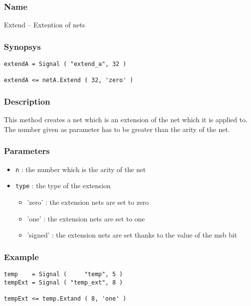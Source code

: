 \subsubsection{Name}

Extend -- Extention of nets

\subsubsection{Synopsys}

\begin{verbatim}
extendA = Signal ( "extend_a", 32 )

extendA <= netA.Extend ( 32, 'zero' ) 
\end{verbatim}

\subsubsection{Description}

This method creates a net which is an extension of the net which it is applied to. The number given as parameter has to be greater than the arity of the net.

\subsubsection{Parameters}

\begin{itemize}
    \item \verb-n- : the number which is the arity of the net
    \item \verb-type- : the type of the extension
    \begin{itemize}
        \item 'zero' : the extension nets are set to zero
        \item 'one' : the extension nets are set to one
        \item 'signed' : the extension nets are set thanks to the value of the msb bit
    \end{itemize}
\end{itemize}

\subsubsection{Example}

\begin{verbatim}
temp    = Signal (     "temp", 5 )
tempExt = Signal ( "temp_ext", 8 )

tempExt <= temp.Extand ( 8, 'one' )
\end{verbatim}

